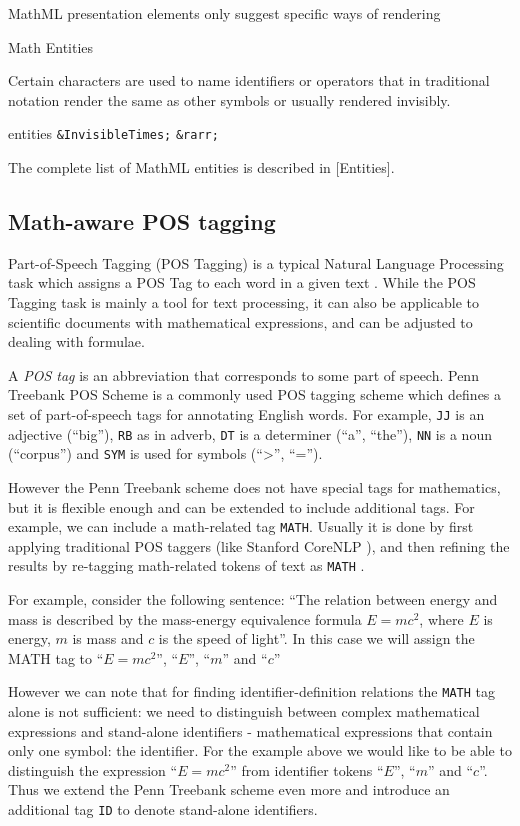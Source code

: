 MathML presentation elements only suggest specific ways of rendering

Math Entities

Certain characters are used to name identifiers or operators that in
traditional notation render the same as other symbols or usually
rendered invisibly.

entities \texttt{\&InvisibleTimes;} \texttt{\&rarr;}

The complete list of MathML entities is described in [Entities].




\subsection{Math-aware POS tagging} \label{sec:postagging}
Part-of-Speech Tagging (POS Tagging) is a typical Natural Language Processing 
task which assigns a POS Tag to each word in a given text \cite{jurafsky2000speech}. 
While the POS Tagging task is mainly a tool for text processing, it can 
also be applicable to scientific documents with mathematical expressions, 
and can be adjusted to dealing with formulae. 

A \emph{POS tag} is an abbreviation that corresponds to some
part of speech. Penn Treebank POS Scheme \cite{santorini1990part} is 
a commonly used POS tagging scheme which defines a set of part-of-speech tags 
for annotating English words.
For example, \texttt{JJ} is an adjective (``big''), \texttt{RB} as in adverb, 
\texttt{DT} is a determiner (``a'', ``the''), \texttt{NN} is a 
noun (``corpus'') and \texttt{SYM} is used for symbols (``>'', ``=''). 


However the Penn Treebank scheme does not have special tags for mathematics,
but it is flexible enough and can be extended to include additional tags.
For example, we can include a math-related tag \texttt{MATH}.
Usually it is done by first applying traditional POS taggers (like Stanford
CoreNLP \cite{manning2014stanford}), and then 
refining the results by re-tagging math-related tokens of text as \texttt{MATH}
\cite{schoneberg2014pos}.


For example, consider the following sentence:
``The relation between energy and mass is
described by  the mass-energy equivalence formula $E = mc^2$,
where $E$ is energy, $m$ is mass and $c$ is the speed of light''.
In this case we will assign the MATH tag to ``$E = mc^2$'', ``$E$'',
``$m$'' and ``$c$''

However we can note that for finding identifier-definition relations 
the \texttt{MATH} tag alone is not sufficient: we need to distinguish 
between complex mathematical expressions and stand-alone identifiers - 
mathematical expressions that contain only one symbol: the identifier.
For the example above we would like to be able to distinguish the 
expression ``$E = mc^2$'' from identifier tokens ``$E$'',
``$m$'' and ``$c$''. Thus we extend the Penn Treebank scheme even more 
and introduce an additional tag \texttt{ID} to denote stand-alone identifiers. 


